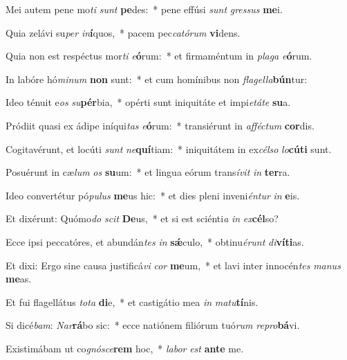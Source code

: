 \item Mei autem pene mo\textit{ti} \textit{sunt} \textbf{pe}des:~* pene effúsi \textit{sunt} \textit{gres}\textit{sus} \textbf{me}i.
\item Quia zelávi su\textit{per} \textit{in}\textbf{í}quos,~* pacem pec\textit{ca}\textit{tó}\textit{rum} \textbf{vi}dens.
\item Quia non est respéctus mor\textit{ti} \textit{e}\textbf{ó}rum:~* et firmaméntum in \textit{pla}\textit{ga} \textit{e}\textbf{ó}rum.
\item In labóre hó\textit{mi}\textit{num} \textbf{non} sunt:~* et cum homínibus non \textit{fla}\textit{gel}\textit{la}\textbf{bún}tur:
\item Ideo ténuit e\textit{os} \textit{su}\textbf{pér}bia,~* opérti sunt iniquitáte et impi\textit{e}\textit{tá}\textit{te} \textbf{su}a.
\item Pródiit quasi ex ádipe iníqui\textit{tas} \textit{e}\textbf{ó}rum:~* transiérunt in \textit{af}\textit{féc}\textit{tum} \textbf{cor}dis.
\item Cogitavérunt, et locúti \textit{sunt} \textit{ne}\textbf{quí}tiam:~* iniquitátem in ex\textit{cél}\textit{so} \textit{lo}\textbf{cú}\textbf{ti} sunt.
\item Posuérunt in cæ\textit{lum} \textit{os} \textbf{su}um:~* et lingua eórum trans\textit{í}\textit{vit} \textit{in} \textbf{ter}ra.
\item Ideo convertétur pó\textit{pu}\textit{lus} \textbf{me}us hic:~* et dies pleni inveni\textit{én}\textit{tur} \textit{in} \textbf{e}is.
\item Et dixérunt: Quómo\textit{do} \textit{scit} \textbf{De}us,~* et si est sciénti\textit{a} \textit{in} \textit{ex}\textbf{cél}so?
\item Ecce ipsi peccatóres, et abundán\textit{tes} \textit{in} \textbf{sǽ}culo,~* obtinu\textit{é}\textit{runt} \textit{di}\textbf{ví}\textbf{ti}as.
\item Et dixi: Ergo sine causa justificá\textit{vi} \textit{cor} \textbf{me}um,~* et lavi inter innocén\textit{tes} \textit{ma}\textit{nus} \textbf{me}as.
\item Et fui flagellátus \textit{to}\textit{ta} \textbf{di}e,~* et castigátio mea \textit{in} \textit{ma}\textit{tu}\textbf{tí}nis.
\item Si dicé\textit{bam}: \textit{Nar}\textbf{rá}bo sic:~* ecce natiónem filiórum tuó\textit{rum} \textit{re}\textit{pro}\textbf{bá}vi.
\item Existimábam ut co\textit{gnó}\textit{sce}\textbf{rem} hoc,~* \textit{la}\textit{bor} \textit{est} \textbf{an}\textbf{te} me.
